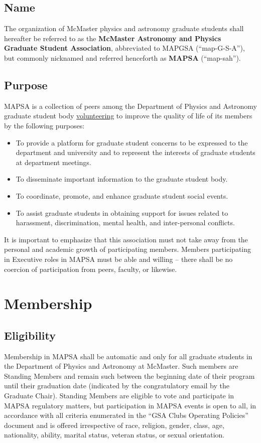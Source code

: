 \documentclass[8pt]{article}
\begin{document}
	\subsection{Name}
	The organization of McMaster physics and astronomy graduate students shall hereafter be referred to as the \textbf{McMaster Astronomy and Physics Graduate Student Association}, abbreviated to MAPGSA (``map-G-S-A''), but commonly nicknamed and referred henceforth as \textbf{MAPSA} (``map-sah'').
	\subsection{Purpose}
	MAPSA is a collection of peers among the Department of Physics and Astronomy graduate student body \underline{volunteering} to improve the quality of life of its members by the following purposes:
	\begin{itemize}
		\item To provide a platform for graduate student concerns to be expressed to the department and university and to represent the interests of graduate students at department meetings.
		\item To disseminate important information to the graduate student body.
		\item To coordinate, promote, and enhance graduate student social events.
		\item To assist graduate students in obtaining support for issues related to harassment, discrimination, mental health, and inter-personal conflicts.
	\end{itemize}
	It is important to emphasize that this association must not take away from the personal and academic growth of participating members. Members participating in Executive roles in MAPSA must be able and willing -- there shall be no coercion of participation from peers, faculty, or likewise.
	
	\section{Membership}
	\subsection{Eligibility}
	Membership in MAPSA shall be automatic and only for all graduate students in the Department of Physics and Astronomy at McMaster. Such members are Standing Members and remain such between the beginning date of their program until their graduation date (indicated by the congratulatory email by the Graduate Chair). Standing Members are eligible to vote and participate in MAPSA regulatory matters, but participation in MAPSA events is open to all, in accordance with all criteria enumerated in the ``GSA Clubs Operating Policies'' document and is offered irrespective of race, religion, gender, class, age, nationality, ability, marital status, veteran status, or sexual orientation. 
	
\end{document}
